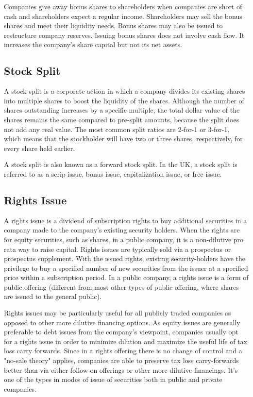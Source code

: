 Companies give away bonus shares to shareholders when companies are short of cash and shareholders expect a regular income. Shareholders may sell the bonus shares and meet their liquidity needs. Bonus shares may also be issued to restructure company reserves. Issuing bonus shares does not involve cash flow. It increases the company’s share capital but not its net assets.


\subsection{Stock Split}
A stock split is a corporate action in which a company divides its existing shares into multiple shares to boost the liquidity of the shares. Although the number of shares outstanding increases by a specific multiple, the total dollar value of the shares remains the same compared to pre-split amounts, because the split does not add any real value. The most common split ratios are 2-for-1 or 3-for-1, which means that the stockholder will have two or three shares, respectively, for every share held earlier.

A stock split is also known as a forward stock split. In the UK, a stock split is referred to as a scrip issue, bonus issue, capitalization issue, or free issue.


\subsection{Rights Issue}
A rights issue is a dividend of subscription rights to buy additional securities in a company made to the company's existing security holders. When the rights are for equity securities, such as shares, in a public company, it is a non-dilutive pro rata way to raise capital. Rights issues are typically sold via a prospectus or prospectus supplement. With the issued rights, existing security-holders have the privilege to buy a specified number of new securities from the issuer at a specified price within a subscription period. In a public company, a rights issue is a form of public offering (different from most other types of public offering, where shares are issued to the general public).

Rights issues may be particularly useful for all publicly traded companies as opposed to other more dilutive financing options. As equity issues are generally preferable to debt issues from the company's viewpoint, companies usually opt for a rights issue in order to minimize dilution and maximize the useful life of tax loss carry forwards. Since in a rights offering there is no change of control and a "no-sale theory" applies, companies are able to preserve tax loss carry-forwards better than via either follow-on offerings or other more dilutive financings. It's one of the types in modes of issue of securities both in public and private companies.

